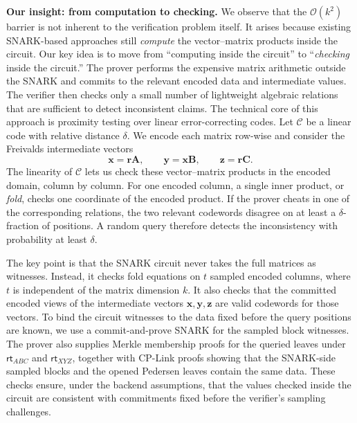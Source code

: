 \documentclass[conference,compsoc]{IEEEtran}
\newcommand{\rt}{\textsf{rt}}
\newcommand{\mat}{\mathbf}          %
\newcommand{\vect}{\mathbf}         %
\theoremstyle{plain}
\theoremstyle{definition}
\theoremstyle{remark}
\begin{document}
\noindent\textbf{Our insight: from computation to checking.}
We observe that the \(\mathcal{O}(k^2)\) barrier is not inherent to the
verification problem itself.  It arises because existing SNARK-based approaches
still \emph{compute} the vector--matrix products inside the circuit.  Our key
idea is to move from ``computing inside the circuit'' to ``\emph{checking} inside the
circuit.''  The prover performs the expensive matrix arithmetic outside the
SNARK and commits to the relevant encoded data and intermediate values.  The
verifier then checks only a small number of lightweight algebraic relations
that are sufficient to detect inconsistent claims.
The technical core of this approach is proximity testing over linear
error-correcting codes.  Let \(\mathcal{C}\) be a linear code with relative
distance \(\delta\).  We encode each matrix row-wise and consider the Freivalds
intermediate vectors
\[
  \vect{x}=\vect{r}\mat{A},\qquad
  \vect{y}=\vect{x}\mat{B},\qquad
  \vect{z}=\vect{r}\mat{C}.
\]
The linearity of \(\mathcal{C}\) lets us check these vector--matrix products in
the encoded domain, column by column.  For one encoded column, a single inner
product, or \emph{fold}, checks one coordinate of the encoded product.  If the
prover cheats in one of the corresponding relations, the two relevant
codewords disagree on at least a \(\delta\)-fraction of positions.  A random
query therefore detects the inconsistency with probability at least \(\delta\).

The key point is that the SNARK circuit never takes the full matrices as witnesses.  Instead, it checks fold equations on \(t\) sampled encoded columns, where \(t\) is independent of the matrix dimension \(k\).  It also checks that the committed encoded views of the intermediate vectors \(\vect{x},\vect{y},\vect{z}\) are valid codewords for those vectors.  
To bind the circuit witnesses to the data fixed before the query positions are known,
we use a commit-and-prove SNARK for the sampled block witnesses.  The prover
also supplies Merkle membership proofs for the queried leaves under
\(\rt_{ABC}\) and \(\rt_{XYZ}\), together with CP-Link proofs showing that the
SNARK-side sampled blocks and the opened Pedersen leaves contain the same data.
These checks ensure, under the backend assumptions, that the values checked
inside the circuit are consistent with commitments fixed before the verifier's
sampling challenges.

\end{document}
